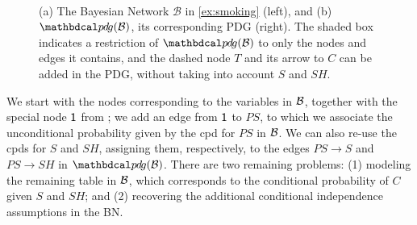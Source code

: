 \documentclass{article}
\begin{document}
\begin{example}[emulating a BN]
\begin{figure}[ht!]
\fi
	\hfill~
	\label{subfig:smoking-pdg}
\addtocounter{figure}{-1}
\caption{ (a) The Bayesian Network $\mathcal B$ in \cref{ex:smoking} (left), and
(b) $\PDGof{\mathcal B}$, its corresponding PDG (right). The shaded box
indicates a restriction of $\PDGof{\mathcal B}$ to only the nodes and edges it
contains, and the dashed node $T$ and its arrow to $C$ can be added in the PDG,
without taking into account $S$ and $SH$.}
\label{fig:smoking-bn+pdg}
\end{figure}

We start with the nodes corresponding to the variables in $\cal B$, together
with the special node $\sf 1$ from ; we add an edge
from ${\sf 1}$ to $\mathit{PS}$, to which we associate the unconditional
probability given by the cpd for $\mathit{PS}$ in $\cal B$. We can also re-use
the cpds for $S$ and $\mathit{SH}$, assigning them, respectively, to the edges
$PS \to S$ and $PS \to SH$ in $\PDGof{{\mathcal B}}$.
There are two remaining problems: (1) modeling the remaining table in $\cal B$,
which corresponds to the conditional probability of $C$ given $S$ and $SH$; and
(2) recovering the additional
conditional
independence assumptions in the BN. 


\end{example}
\end{document}
